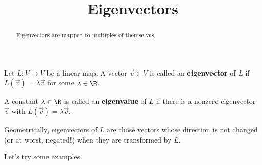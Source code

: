 \documentclass{ximera}
\title{Eigenvectors}
\begin{document}
\begin{abstract}
  Eigenvectors are mapped to multiples of themselves.
\end{abstract}

\begin{definition}
  Let $L:V \to V$ be a linear map.  A vector $\vec{v} \in V$ is called
  an \textbf{eigenvector} of $L$ if $L(\vec{v}) = \lambda \vec{v}$ for
  some $\lambda \in \R$.

  A constant $\lambda \in \R$ is called an \textbf{eigenvalue} of $L$
  if there is a nonzero eigenvector $\vec{v}$ with $L(\vec{v}) =
  \lambda \vec{v}$.
\end{definition}

Geometrically, eigenvectors of $L$ are those vectors whose direction
is not changed (or at worst, negated!) when they are transformed by
$L$.

Let's try some examples.
\end{document}
